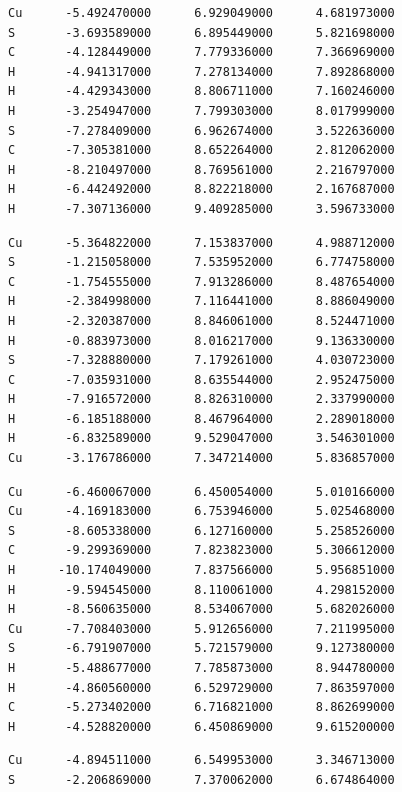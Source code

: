 \documentclass[a4paper,12pt]{article}
\begin{document}
\begin{onehalfspace}
	\begin{verbatim}			
Cu      -5.492470000      6.929049000      4.681973000
S       -3.693589000      6.895449000      5.821698000
C       -4.128449000      7.779336000      7.366969000
H       -4.941317000      7.278134000      7.892868000
H       -4.429343000      8.806711000      7.160246000
H       -3.254947000      7.799303000      8.017999000
S       -7.278409000      6.962674000      3.522636000
C       -7.305381000      8.652264000      2.812062000
H       -8.210497000      8.769561000      2.216797000
H       -6.442492000      8.822218000      2.167687000
H       -7.307136000      9.409285000      3.596733000
	\end{verbatim}
	\begin{verbatim}
Cu      -5.364822000      7.153837000      4.988712000
S       -1.215058000      7.535952000      6.774758000
C       -1.754555000      7.913286000      8.487654000
H       -2.384998000      7.116441000      8.886049000
H       -2.320387000      8.846061000      8.524471000
H       -0.883973000      8.016217000      9.136330000
S       -7.328880000      7.179261000      4.030723000
C       -7.035931000      8.635544000      2.952475000
H       -7.916572000      8.826310000      2.337990000
H       -6.185188000      8.467964000      2.289018000
H       -6.832589000      9.529047000      3.546301000
Cu      -3.176786000      7.347214000      5.836857000
	\end{verbatim}
	\newpage
	\begin{verbatim}
Cu      -6.460067000      6.450054000      5.010166000
Cu      -4.169183000      6.753946000      5.025468000
S       -8.605338000      6.127160000      5.258526000
C       -9.299369000      7.823823000      5.306612000
H      -10.174049000      7.837566000      5.956851000
H       -9.594545000      8.110061000      4.298152000
H       -8.560635000      8.534067000      5.682026000
Cu      -7.708403000      5.912656000      7.211995000
S       -6.791907000      5.721579000      9.127380000
H       -5.488677000      7.785873000      8.944780000
H       -4.860560000      6.529729000      7.863597000
C       -5.273402000      6.716821000      8.862699000
H       -4.528820000      6.450869000      9.615200000
	\end{verbatim}
	\begin{verbatim}
Cu      -4.894511000      6.549953000      3.346713000
S       -2.206869000      7.370062000      6.674864000

\end{verbatim}
\end{onehalfspace}
\end{document}
